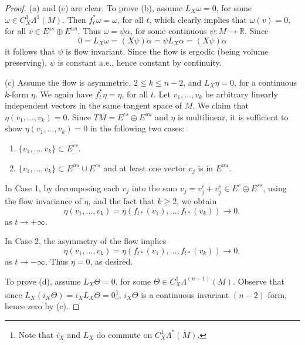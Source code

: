 \documentclass[10pt,a4paper]{amsart}
\newcommand{\R}{\mathbb{R}}                     %
\begin{document}
\begin{proof}
  (a) and (e) are clear. To prove (b), assume $L_X \omega = 0$, for
  some $\omega \in C^1_X \Lambda^1(M)$.  Then
  $f_t^\ast \omega = \omega$, for all $t$, which clearly implies that
  $\omega(v) = 0$, for all $v \in E^{ss} \oplus E^{uu}$. Thus
  $\omega = \psi \alpha$, for some continuous $\psi : M \to \R$. Since
    \begin{displaymath}
      0 = L_X \omega = (X\psi) \alpha = \psi L_X \alpha = (X \psi) \alpha
    \end{displaymath}
    it follows that $\psi$ is flow invariant. Since the flow is
    ergodic (being volume preserving), $\psi$ is constant a.e., hence
    constant by continuity.

    (c) Assume the flow is asymmetric, $2 \leq k \leq n-2$, and
    $L_X \eta = 0$, for a continuous $k$-form $\eta$. We again have
    $f_t^\ast \eta = \eta$, for all $t$. Let $v_1, \ldots, v_k$ be
    arbitrary linearly independent vectors in the same tangent space
    of $M$. We claim that $\eta(v_1,\ldots,v_k) = 0$. Since
    $TM = E^{cs} \oplus E^{uu}$ and $\eta$ is multilinear, it is
    sufficient to show $\eta(v_1,\ldots,v_k) = 0$ in the following two
    cases:

  \begin{enumerate}
%
  \item[\textbf{Case 1}:] $\{ v_1, \ldots, v_k \} \subset E^{cs}$.
%
  \item[\textbf{Case 2}:]
    $\{ v_1, \ldots, v_k \} \subset E^{uu} \cup E^{cs}$ and at
    least one vector $v_j$ is in $E^{uu}$.
%
  \end{enumerate}

  \nopagebreak[4] In Case 1, by decomposing each $v_j$ into the sum
  $v_j = v_j^c + v_j^s \in E^c \oplus E^{ss}$, using the flow
  invariance of $\eta$, and the fact that $k \geq 2$, we obtain
%
    \begin{displaymath}
      \eta(v_1,\ldots,v_k) = \eta(f_{t \ast}(v_1), \ldots, f_{t
        \ast}(v_k)) \to 0,
    \end{displaymath}
%
    as $t \to +\infty$.

    In Case 2, the asymmetry of the flow implies 
%
    \begin{displaymath}
      \eta(v_1,\ldots,v_k) = \eta(f_{t \ast}(v_1), \ldots, f_{t
        \ast}(v_k)) \to 0,
    \end{displaymath}
%
    as $t \to -\infty$. Thus $\eta = 0$, as desired.

    To prove (d), assume $L_X \Theta = 0$, for some 
    $\Theta \in C^1_X \Lambda^{(n-1)}(M)$. Observe that since
    $L_X (i_X \Theta) = i_X L_X \Theta = 0$\footnote{Note that $i_X$
      and $L_X$ do commute on $C^1_X \Lambda^\ast(M)$.}, $i_X \Theta$
    is a continuous invariant $(n-2)$-form, hence zero by (c).


\end{proof}
\end{document}
